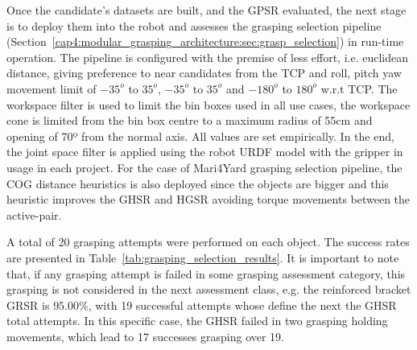 Once the candidate's datasets are built, and the \ac{GPSR} evaluated, the next stage is to deploy them into the robot and assesses the grasping selection pipeline (Section~\ref{cap4:modular_grasping_architecture:sec:grasp_selection}) in run-time operation. The pipeline is configured with the premise of less effort, i.e. euclidean distance, giving preference to near candidates from the \ac{TCP} and roll, pitch yaw movement limit of $-35^o$ to $35^o$, $-35^o$ to $35^o$ and $-180^o$ to $180^o$ w.r.t \ac{TCP}. The workspace filter is used to limit the bin boxes used in all use cases, the workspace cone is limited from the bin box centre to a maximum radius of 55cm and opening of 70º from the normal axis. All values are set empirically. In the end, the joint space filter is applied using the robot URDF model with the gripper in usage in each project. For the case of Mari4Yard grasping selection pipeline, the \ac{COG} distance heuristics is also deployed since the objects are bigger and this heuristic improves the \ac{GHSR} and \ac{HGSR} avoiding torque movements between the active-pair. 

A total of 20 grasping attempts were performed on each object. The success rates are presented in Table~\ref{tab:grasping_selection_results}. It is important to note that, if any grasping attempt is failed in some grasping assessment category, this grasping is not considered in the next assessment class, e.g. the reinforced bracket \ac{GRSR} is $95.00\%$, with 19 successful attempts whose define the next the \ac{GHSR} total attempts. In this specific case, the \ac{GHSR} failed in two grasping holding movements, which lead to 17 successes grasping over 19.

